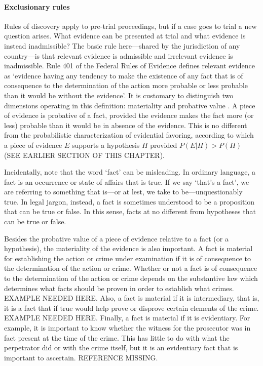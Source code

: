 \documentclass[10pt]{article}
\begin{document}
\paragraph{Exclusionary rules}

Rules of discovery apply to pre-trial proceedings, but if a case goes to trial a new question arises. 
What evidence can be presented at trial and what evidence is instead inadmissible? 
The basic rule here---shared by the jurisdiction of any country---is that relevant evidence is admissible 
and irrelevant evidence is inadmissible. Rule 401 of the Federal Rules of Evidence defines relevant evidence 
as `evidence having any tendency to make the existence of any fact that is of consequence to the determination of the action more probable or less probable than it would be without the evidence'. 
It is customary to distinguish two dimensions operating in this definition: materiality and probative value \citep{Fisher2008Evidence, Mendez2008}. A piece of evidence is probative of a fact, provided the evidence makes the fact more (or less) probable than it would be in absence of the evidence. This is no different from the probabilistic characterization of evidential favoring, according to which a piece of evidence $E$ supports a hypothesis $H$ provided $P(E|H)> P(H)$ (SEE EARLIER SECTION OF THIS CHAPTER). 

Incidentally, note that the word `fact' can be misleading. In ordinary language, a fact is an occurrence or state of affairs that is true. If we say `that's a fact', we are referring to something that is---or at lest, we take to be---unquestionably true. In legal jargon, instead, a fact is sometimes understood to be a proposition 
that can be true or false. In this sense, facts at no different from hypotheses that can be true or false.


Besides the probative value of a piece of evidence relative to a fact (or a hypothesis), the materiality of the evidence 
is also important. A fact is material for establishing the action or crime under examination if it is of consequence to the determination of the action or crime. Whether or not a fact is of consequence to the determination of the action or crime depends on the substantive law which determines what facts should be proven in order to establish what crimes. EXAMPLE NEEDED HERE. Also, a fact is material if it is intermediary, that is, it is a fact that if true would help prove or disprove certain elements of the crime. EXAMPLE NEEDED HERE. Finally, a fact is material if it is evidentiary. For example, it is important to know whether the witness for the prosecutor was in fact present at the time of the crime. This has little to do with what the perpetrator did or with the crime itself, but it is an evidentiary fact that is important to ascertain.  
REFERENCE MISSING. 
\end{document}
